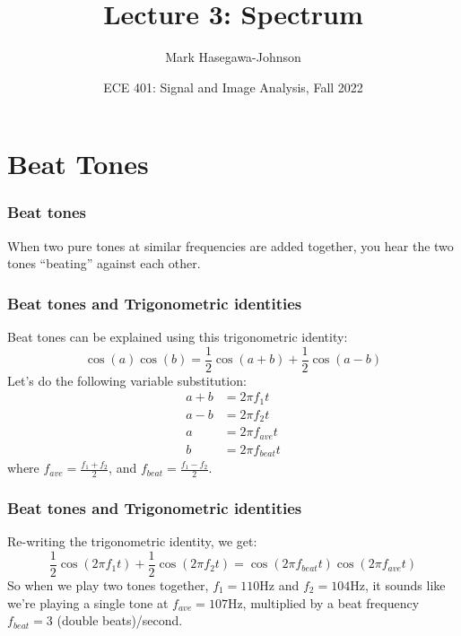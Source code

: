 \documentclass{beamer}
\title{Lecture 3: Spectrum}
\author{Mark Hasegawa-Johnson}
\date{ECE 401: Signal and Image Analysis, Fall 2022}
\begin{document}
\begin{frame}
  \maketitle
\end{frame}

\begin{frame}
  \tableofcontents
\end{frame}

\section[Beating]{Beat Tones}
\setcounter{subsection}{1}

\begin{frame}
  \frametitle{Beat tones}

  When two pure tones at similar frequencies are added together, you hear the  two tones
  ``beating'' against each other.
  \vspace*{1cm}
  \centerline{}
\end{frame}

\begin{frame}
  \frametitle{Beat tones and Trigonometric identities}

  Beat tones can be explained using this trigonometric identity:
  \[
  \cos(a)\cos(b)=\frac{1}{2}\cos(a+b)+\frac{1}{2}\cos(a-b)
  \]
  Let's do the following variable substitution:
  \begin{align*}
    a+b &= 2\pi f_1 t\\
    a-b &= 2\pi f_2 t\\
    a &= 2\pi f_{ave}t\\
    b &= 2\pi f_{beat}t
  \end{align*}
  where $f_{ave}=\frac{f_1+f_2}{2}$, and $f_{beat}=\frac{f_1-f_2}{2}$.
\end{frame}

\begin{frame}
  \frametitle{Beat tones and Trigonometric identities}

  Re-writing the trigonometric identity, we get:
  \[
  \frac{1}{2}\cos(2\pi f_1t)+\frac{1}{2}\cos(2\pi f_2 t) = \cos(2\pi f_{beat}t)\cos(2\pi f_{ave}t)
  \]
  So when we play two tones together, $f_1=110$Hz and $f_2=104$Hz, it
  sounds like we're playing a single tone at $f_{ave}=107$Hz,
  multiplied by a beat frequency $f_{beat}=3$ (double beats)/second.
\end{frame}
\end{document}
